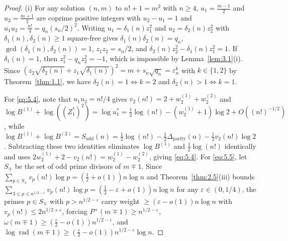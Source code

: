 \documentclass[11pt,reqno]{amsart}
\theoremstyle{remark}
\numberwithin{equation}{section}
\newcommand{\Sodd}{S_{\mathrm{odd}}}
\newcommand{\Dparity}{\Delta_{\mathrm{parity}}}
\DeclareMathOperator{\rad}{rad}
\begin{document}
\begin{proof}
(i) For any solution $(n, m)$ to $n! + 1 = m^2$ with $n \ge 4$, $u_1 = \frac{m-1}{2}$ and $u_2 = \frac{m+1}{2}$ are coprime positive integers with $u_2 - u_1 = 1$ and $u_1 u_2 = \frac{n!}{4} = q_n(s_n/2)^2$. Writing $u_1 = \delta_1(n)z_1^2$ and $u_2 = \delta_2(n)z_2^2$ with $\delta_1(n), \delta_2(n) \ge 1$ square-free gives $\delta_1(n)\delta_2(n) = q_n$, $\gcd(\delta_1(n), \delta_2(n)) = 1$, $z_1 z_2 = s_n/2$, and $\delta_2(n)z_2^2 - \delta_1(n)z_1^2 = 1$. If $\delta_1(n) = 1$, then $z_1^2 - q_n z_2^2 = -1$, which is impossible by Lemma~\ref{lem:3.1}(i). Since $(z_2\sqrt{\delta_2(n)} + z_1\sqrt{\delta_1(n)})^2 = m + s_n\sqrt{q_n} = \varepsilon_n^k$ with $k \in \{1, 2\}$ by Theorem~\ref{thm:1.1}, we have $\delta_2(n) = 1 \iff k = 2$ and $\delta_2(n) > 1 \iff k = 1$.

For \eqref{eq:5.4}, note that $u_1 u_2 = n!/4$ gives $v_2(n!) = 2 + w_2^{(1)} + w_2^{(2)}$ and $\log B^{(1)} + \log((Z_1^*)^2) = \log u_1^* = \frac{1}{2}\log(n!) - (w_2^{(1)} + 1)\log 2 + O((n!)^{-1/2})$, while $\log B^{(1)} + \log B^{(2)} = \Sodd(n) = \frac{1}{2}\log(n!) - \frac{1}{2}\Dparity(n) - \frac{1}{2}v_2(n!)\log 2$. Subtracting these two identities eliminates $\log B^{(1)}$ and $\frac{1}{2}\log(n!)$ identically and uses $2w_2^{(1)} + 2 - v_2(n!) = w_2^{(1)} - w_2^{(2)}$, giving \eqref{eq:5.4}. For \eqref{eq:5.5}, let $S_\mp$ be the set of odd prime divisors of $m \mp 1$. Since $\sum_{p \in S_\mp} v_p(n!)\log p = (\frac{1}{2} + o(1))n\log n$ and Theorem~\ref{thm:2.5}(iii) bounds $\sum_{3 \le p \le n^{1/2-\varepsilon}} v_p(n!)\log p = (\frac{1}{2} - \varepsilon + o(1))n\log n$ for any $\varepsilon \in (0, 1/4)$, the primes $p \in S_\mp$ with $p > n^{1/2-\varepsilon}$ carry weight $\ge (\varepsilon - o(1))n\log n$ with $v_p(n!) \le 2n^{1/2+\varepsilon}$, forcing $P^+(m \mp 1) \ge n^{1/2-\varepsilon}$, $\omega(m \mp 1) \ge (\frac{\varepsilon}{2} - o(1))n^{1/2-\varepsilon}$, and $\log\rad(m \mp 1) \ge (\frac{\varepsilon}{2} - o(1))n^{1/2-\varepsilon}\log n$.


\end{proof}
\end{document}
